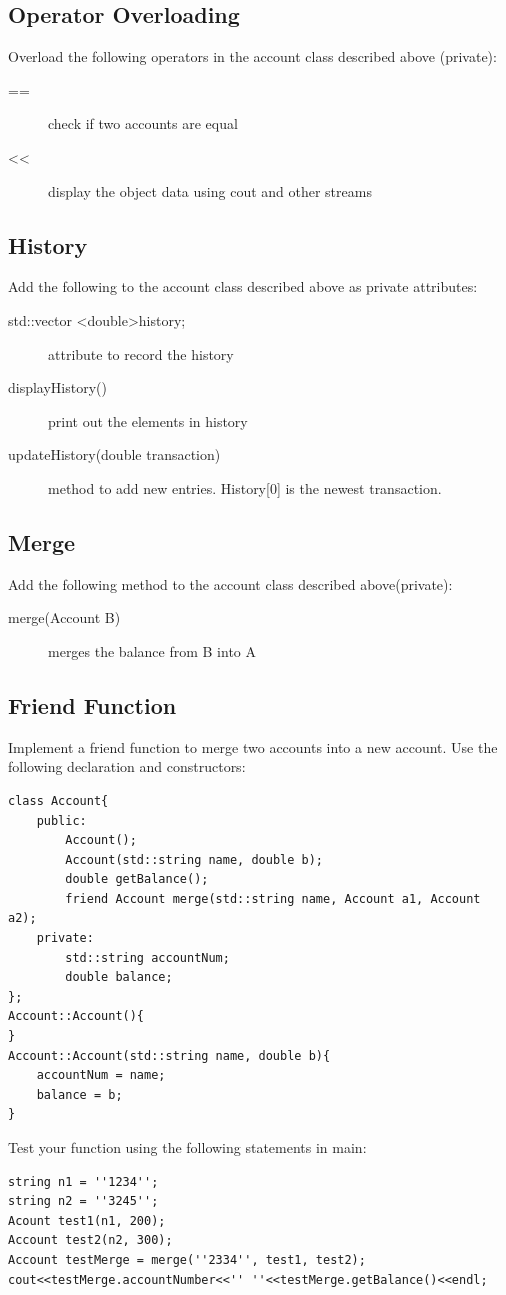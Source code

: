 \documentclass{article}
\begin{document}
\subsection{Operator Overloading}
Overload the following operators in the account class described above (private):
\begin{description}
    \item[==] check if two accounts are equal
    \item[\textless\textless]  display the object data using cout and other streams
\end{description}

\subsection{History}
Add the following to the account class described above as private attributes:
\begin{description}
    \item[std::vector \textless double\textgreater history;] attribute to record the history
    \item[displayHistory()] print out the elements in history
    \item[updateHistory(double transaction)] method to add new
    entries. History[0] is the newest transaction.
\end{description}
 
\subsection{Merge}
Add the following method to the account class described above(private):
\begin{description}
    \item[merge(Account B)] merges the balance from B into A
\end{description}

\subsection{Friend Function}
Implement a friend function to merge two accounts into a new account.
Use the following declaration and constructors:
\begin{verbatim}
class Account{
    public:
        Account();
        Account(std::string name, double b);
        double getBalance();
        friend Account merge(std::string name, Account a1, Account a2);
    private:
        std::string accountNum;
        double balance;
};
Account::Account(){
}
Account::Account(std::string name, double b){
    accountNum = name;
    balance = b;
}
\end{verbatim}
Test your function using the following statements in main:
\begin{verbatim}
string n1 = ''1234'';
string n2 = ''3245'';
Acount test1(n1, 200);
Account test2(n2, 300);
Account testMerge = merge(''2334'', test1, test2);
cout<<testMerge.accountNumber<<'' ''<<testMerge.getBalance()<<endl;
\end{verbatim}
\end{document}
